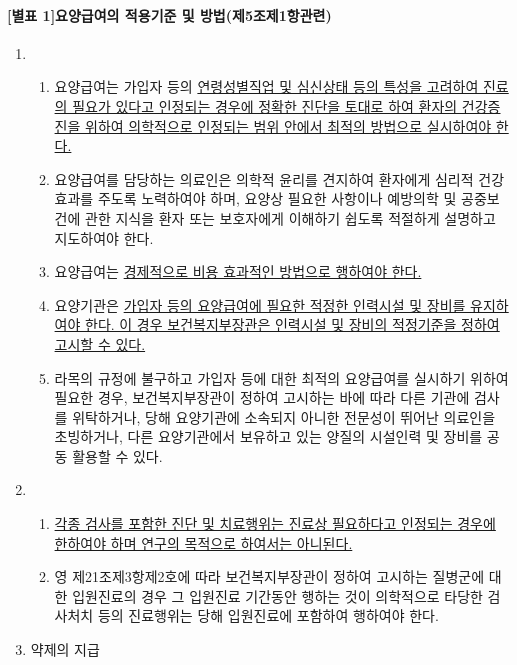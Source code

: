 \paragraph{[별표 1]요양급여의 적용기준 및 방법(제5조제1항관련)}
\begin{enumerate}[1.]\tightlist
\item {}
	\begin{enumerate}[가.]\tightlist
	\item 요양급여는 가입자 등의 \uline{연령\cntrdot{}성별\cntrdot{}직업 및 심신상태 등의 특성을 고려하여 진료의 필요가 있다고 인정되는 경우에 정확한 진단을 토대로 하여 환자의 건강증진을 위하여 의학적으로 인정되는 범위 안에서 최적의 방법으로 실시하여야 한다.}
	\item 요양급여를 담당하는 의료인은 의학적 윤리를 견지하여 환자에게 심리적 건강효과를 주도록 노력하여야 하며, 요양상 필요한 사항이나 예방의학 및 공중보건에 관한 지식을 환자 또는 보호자에게 이해하기 쉽도록 적절하게 설명하고 지도하여야 한다.
	\item 요양급여는 \uline{경제적으로 비용 효과적인 방법으로 행하여야 한다.}
	\item 요양기관은 \uline{가입자 등의 요양급여에 필요한 적정한 인력\cntrdot{}시설 및 장비를 유지하여야 한다. 이 경우 보건복지부장관은 인력\cntrdot{}시설 및 장비의 적정기준을 정하여 고시할 수 있다.}
	\item 라목의 규정에 불구하고 가입자 등에 대한 최적의 요양급여를 실시하기 위하여 필요한 경우, 보건복지부장관이 정하여 고시하는 바에 따라 다른 기관에 검사를 위탁하거나, 당해 요양기관에 소속되지 아니한 전문성이 뛰어난 의료인을 초빙하거나, 다른 요양기관에서 보유하고 있는 양질의 시설\cntrdot{}인력 및 장비를 공동 활용할 수 있다.
	\end{enumerate}
\item {}
	\begin{enumerate}[가.]\tightlist
	\item \uline{각종 검사를 포함한 진단 및 치료행위는 진료상 필요하다고 인정되는 경우에 한하여야 하며 연구의 목적으로 하여서는 아니된다.}
	\item 영 제21조제3항제2호에 따라 보건복지부장관이 정하여 고시하는 질병군에 대한 입원진료의 경우 그 입원진료 기간동안 행하는 것이 의학적으로 타당한 검사\cntrdot{}처치 등의 진료행위는 당해 입원진료에 포함하여 행하여야 한다.
	\end{enumerate}
\item 약제의 지급 
	\begin{enumerate}[가.]\tightlist

\end{enumerate}
\end{enumerate}
